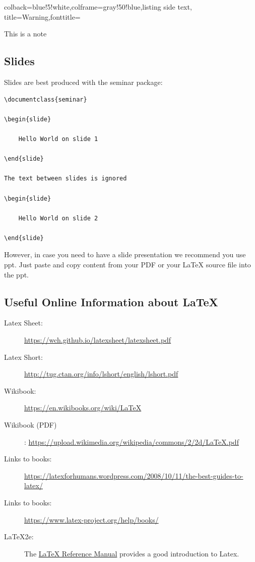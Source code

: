 \begin{tcblisting}{colback=blue!5!white,colframe=gray!50!blue,listing side text,  title=Warning,fonttitle=\bfseries}
\begin{WARNING}
This is a note
\end{WARNING}
\end{tcblisting}


\subsection{Slides}\label{slides}

Slides are best produced with the seminar package:

\begin{verbatim}
\documentclass{seminar}

\begin{slide}

    Hello World on slide 1

\end{slide}

The text between slides is ignored

\begin{slide}

    Hello World on slide 2

\end{slide}
\end{verbatim}

However, in case you need to have a slide presentation we recommend you
use ppt. Just paste and copy content from your PDF or your LaTeX source
file into the ppt.


\subsection{Useful Online Information about \LaTeX }

\begin{description}


\item[Latex Sheet:]    \url{https://wch.github.io/latexsheet/latexsheet.pdf}

\item[Latex Short:]    \url{http://tug.ctan.org/info/lshort/english/lshort.pdf}

\item[Wikibook:]       \url{https://en.wikibooks.org/wiki/LaTeX}
\item[Wikibook (PDF)]: \url{https://upload.wikimedia.org/wikipedia/commons/2/2d/LaTeX.pdf}

\item [Links to books:] \url{https://latexforhumans.wordpress.com/2008/10/11/the-best-guides-to-latex/}
\item [Links to books:] \url{https://www.latex-project.org/help/books/}
\item [LaTeX2e:]
  The
  \href{http://texdoc.net/texmf-dist/doc/latex/latex2e-help-texinfo/latex2e.pdf}{LaTeX
  Reference Manual} provides a good introduction to Latex.

\end{description}


